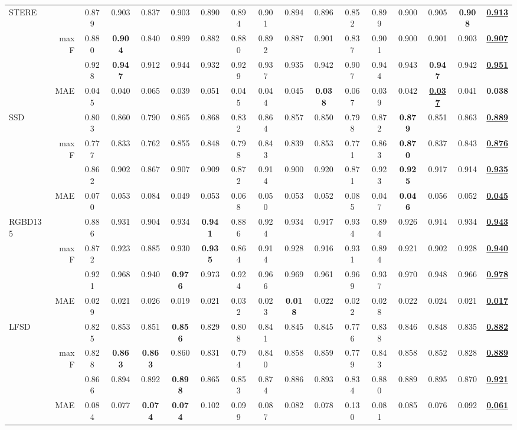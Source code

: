 \documentclass[10pt,twocolumn,letterpaper]{article}
\def\blu#1{\textbf{\color{blue} #1}} \def\red#1{\textbf{\color{red}\underline{#1}}}
\begin{document}
\begin{table*}[t]
\begin{tabular}{lr|cccccccccccccc|c}
  \multirow{4}{*}{STERE}
    &    &0.879 &0.903 &0.837 &0.903 &0.890 &0.894 &0.901 &0.894 &0.896 &0.852 &0.899 &0.900 &0.905 &\blu{0.908} &\red{0.913} \\
    & maxF  &0.880 &\blu{0.904} &0.840 &0.899 &0.882 &0.880 &0.892 &0.887 &0.901 &0.837 &0.901 &0.900 &0.901 &0.903 &\red{0.907} \\
    &  &0.928 &\blu{0.947} &0.912 &0.944 &0.932 &0.929 &0.937 &0.935 &0.942 &0.907 &0.944 &0.943 &\blu{0.947} &0.942 &\red{0.951} \\
    \cite{niu2012stere}  & MAE &0.045 &0.040 &0.065 &0.039 &0.051 &0.045 &0.044 &0.045 &\blu{0.038} &0.067 &0.039 &0.042 &\red{0.037} &0.041 &\blu{0.038}\\
     \hline

  \multirow{4}{*}{SSD}
    &    &0.803 &0.860 &0.790 &0.865 &0.868 &0.832 &0.864 &0.857 &0.850 &0.798 &0.872 &\blu{0.879} &0.851 &0.863 &\red{0.889}\\
    & maxF  &0.777 &0.833 &0.762 &0.855 &0.848 &0.798 &0.843 &0.839 &0.853 &0.771 &0.863 &\blu{0.870} &0.837 &0.843 &\red{0.876} \\
    &   &0.862 &0.902 &0.867 &0.907 &0.909 &0.872 &0.914 &0.900 &0.920 &0.871 &0.923 &\blu{0.925} &0.917 &0.914 &\red{0.935}\\
    \cite{zhu2017ssd}& MAE &0.070 &0.053 &0.084 &0.049 &0.053 &0.068 &0.050 &0.053 &0.052 &0.085 &0.047 &\blu{0.046} &0.056 &0.052 &\red{0.045}\\
     \hline

  \multirow{4}{*}{RGBD135}
    &    &0.886 &0.931 &0.904 &0.934 &\blu{0.941} &0.886 &0.924 &0.934 &0.917 &0.934 &0.894 &0.926 &0.914 &0.934 &\red{0.943}\\
    & maxF  &0.872 &0.923 &0.885 &0.930 &\blu{0.935} &0.864 &0.914 &0.928 &0.916 &0.931 &0.894 &0.921 &0.902 &0.928 &\red{0.940} \\
    &  &0.921 &0.968 &0.940 &\blu{0.976} &0.973 &0.924 &0.966 &0.969 &0.961 &0.969 &0.937 &0.970 &0.948 &0.966 &\red{0.978} \\
    \cite{cheng2014rgbd135}& MAE &0.029 &0.021 &0.026 &0.019 &0.021 &0.032 &0.023 &\blu{0.018} &0.022 &0.022 &0.028 &0.022 &0.024 &0.021 &\red{0.017} \\
     \hline

  \multirow{4}{*}{LFSD}
    &   &0.825 &0.853 &0.851 &\blu{0.856} &0.829 &0.808 &0.841 &0.845 &0.845 &0.776 &0.838 &0.846 &0.848 &0.835 &\red{0.882} \\
    & maxF  &0.828 &\blu{0.863} &\blu{0.863} &0.860 &0.831 &0.794 &0.840 &0.858 &0.859 &0.779 &0.843 &0.858 &0.852 &0.828 &\red{0.889} \\
    &   &0.866 &0.894 &0.892 &\blu{0.898} &0.865 &0.853 &0.874 &0.886 &0.893 &0.834 &0.880 &0.889 &0.895 &0.870 &\red{0.921}\\
    \cite{li2014lfsd}& MAE  &0.084 &0.077 &\blu{0.074} &\blu{0.074} &0.102 &0.099 &0.087 &0.082 &0.078 &0.130 &0.081 &0.085 &0.076 &0.092 &\red{0.061} \\
     \hline


\end{tabular}
\end{table*}
\end{document}
